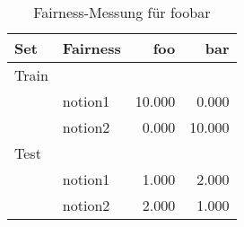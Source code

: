 \begin{table}[ht]
  \centering
  \caption{Fairness-Messung für foobar }%
  \label{tab:foobar-fairness}
  \begin{tabular}{llrr}
    \toprule
    Set & Fairness & foo & bar \\
    \midrule
      Train\\
      & notion1
      & 10.000
      & 0.000
      \\
      & notion2
      & 0.000
      & 10.000
      \\
    \addlinespace
      Test\\
      & notion1
      & 1.000
      & 2.000
      \\
      & notion2
      & 2.000
      & 1.000
      \\
    
    \bottomrule
  \end{tabular}
\end{table}
